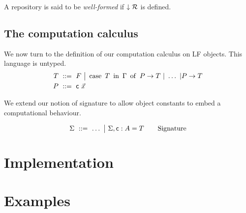 \documentclass[9pt]{sigplanconf}
\begin{document}
A repository is said to be \emph{well-formed} if $\downarrow{\mathcal{R}}$
is defined.

\subsection{The computation calculus}

We now turn to the definition of our computation calculus on LF
objects. This language is untyped. %
\begin{align*}
  T &\ ::=\ 
  F \ {\big|}\ 
  \operatorname{case}\ {{T}\ \operatorname{in}\ {\Gamma}}\ \operatorname{of}\  {P}\to T\ |\ \ldots\ |{P}\to T \\
  P &\ ::=\  {\text{\textsf{c}}}\  {\vec x}
\end{align*}

We extend our notion of signature to allow object constants to embed a
computational behaviour.

$$  \Sigma \ ::=\ 
  \ldots \ {\big|}\ 
  {\Sigma},{\text{\textsf{c}} : A = T}
  \qquad
  \text{Signature}
$$

\section{Implementation}

\section{Examples}







\end{document}
